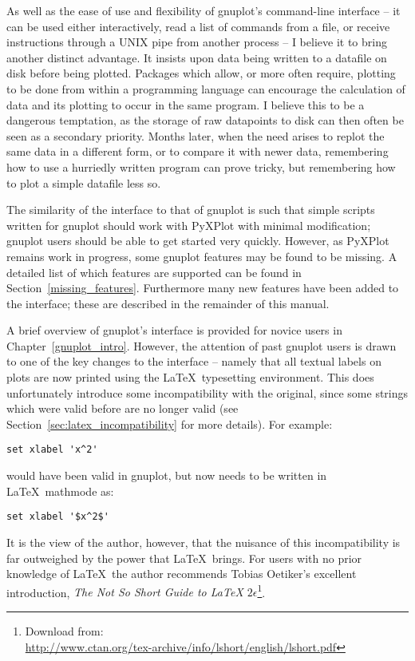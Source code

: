As well as the ease of use and flexibility of gnuplot's command-line interface
-- it can be used either interactively, read a list of commands from a file, or
receive instructions through a UNIX pipe from another process -- I believe it
to bring another distinct advantage. It insists upon data being written to a
datafile on disk before being plotted. Packages which allow, or more often
require, plotting to be done from within a programming language can encourage
the calculation of data and its plotting to occur in the same program. I
believe this to be a dangerous temptation, as the storage of raw datapoints to
disk can then often be seen as a secondary priority. Months later, when the
need arises to replot the same data in a different form, or to compare it with
newer data, remembering how to use a hurriedly written program can prove
tricky, but remembering how to plot a simple datafile less so.

The similarity of the interface to that of gnuplot is such that simple scripts
written for gnuplot should work with PyXPlot with minimal modification; gnuplot
users should be able to get started very quickly.  However, as PyXPlot remains
work in progress, some gnuplot features may be found to be missing.  A detailed
list of which features are supported can be found in
Section~\ref{missing_features}.  Furthermore many new features have been added
to the interface; these are described in the remainder of this manual.

A brief overview of gnuplot's interface is provided for novice users in
Chapter~\ref{gnuplot_intro}. However, the attention of past gnuplot users is
drawn to one of the key changes to the interface -- namely that all textual
labels on plots are now printed using the \LaTeX\ typesetting environment. This
does unfortunately introduce some incompatibility with the original, since some
strings which were valid before are no longer valid (see
Section~\ref{sec:latex_incompatibility} for more details). For example:

\begin{verbatim}set xlabel 'x^2'\end{verbatim}

\noindent would have been valid in gnuplot, but now needs to be written in
\LaTeX\ mathmode as:

\begin{verbatim}set xlabel '$x^2$'\end{verbatim}

\noindent It is the view of the author, however, that the nuisance of this
incompatibility is far outweighed by the power that \LaTeX\ brings. For users
with no prior knowledge of \LaTeX\ the author recommends Tobias Oetiker's
excellent introduction, \textit{The Not So Short Guide to \LaTeX
$2\epsilon$}\footnote{Download from:\\
\url{http://www.ctan.org/tex-archive/info/lshort/english/lshort.pdf}}.

